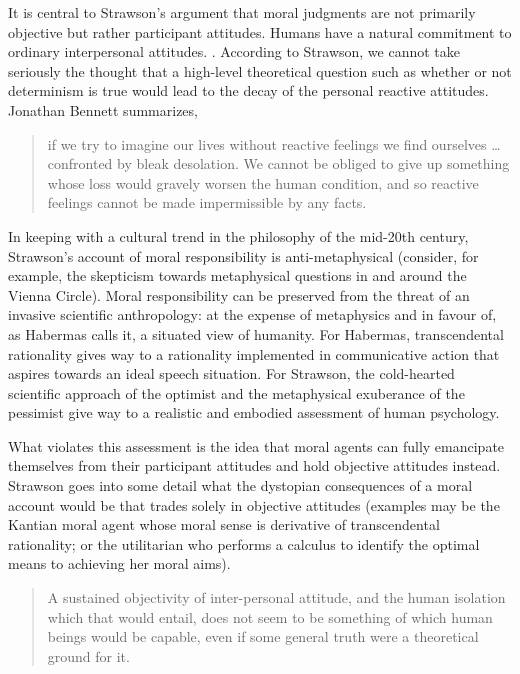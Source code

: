 \documentclass[11pt]{article}
\begin{document}
It is central to Strawson's argument that moral judgments are not
primarily objective but rather participant attitudes. Humans have a
natural commitment to ordinary interpersonal attitudes.  .
According to Strawson, we cannot take seriously the thought that a
high-level theoretical question such as whether or not determinism is
true would lead to the decay of the personal reactive attitudes.
Jonathan Bennett summarizes,

\begin{quote}
  if we try to imagine our lives without reactive feelings we find
  ourselves {\ldots} confronted by bleak desolation. We cannot be
  obliged to give up something whose loss would gravely worsen the
  human condition, and so reactive feelings cannot be made
  impermissible by any facts. 
\end{quote}

In keeping with a cultural trend in the philosophy of the mid-20th
century, Strawson's account of moral responsibility is
anti-metaphysical (consider, for example, the skepticism towards
metaphysical questions in and around the Vienna Circle). Moral
responsibility can be preserved from the threat of an invasive
scientific anthropology: at the expense of metaphysics and in favour
of, as Habermas calls it, a situated view of humanity. For Habermas,
transcendental rationality gives way to a rationality implemented in
communicative action that aspires towards an ideal speech situation.
For Strawson, the cold-hearted scientific approach of the optimist and
the metaphysical exuberance of the pessimist give way to a realistic
and embodied assessment of human psychology.

What violates this assessment is the idea that moral agents can fully
emancipate themselves from their participant attitudes and hold
objective attitudes instead. Strawson goes into some detail what the
dystopian consequences of a moral account would be that trades solely
in objective attitudes (examples may be the Kantian moral agent whose
moral sense is derivative of transcendental rationality; or the
utilitarian who performs a calculus to identify the optimal means to
achieving her moral aims).

\begin{quote}
  A sustained objectivity of inter-personal attitude, and the human
  isolation which that would entail, does not seem to be something of
  which human beings would be capable, even if some general truth were
  a theoretical ground for it. 
\end{quote}
\end{document}

